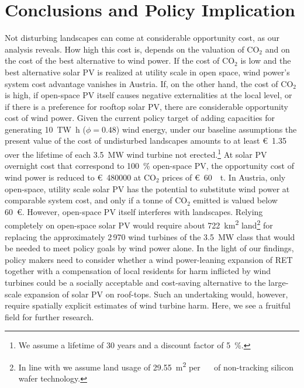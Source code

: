 \documentclass[review, 3p, times, 12pt]{elsarticle} %
\newcommand{\COO}{\ensuremath{\mathrm{CO_2}} }
\begin{document}
\section{Conclusions and Policy Implication} \label{sec:conclusions-policy-implication}
Not disturbing landscapes can come at considerable opportunity cost, as our analysis reveals.
How high this cost is, depends on the valuation of \COO and on the cost of the best alternative to wind power.
If the cost of \COO is low and the best alternative solar PV is realized at utility scale in open space, wind power's system cost advantage vanishes in Austria.
If, on the other hand, the cost of \COO is high, if open-space PV itself causes negative externalities at the local level, or if there is a preference for rooftop solar PV, there are considerable opportunity cost of wind power.
Given the current policy target of adding capacities for generating \SI{10}{\tera\watt\hour} ($\phi=0.48$) wind energy, under our baseline assumptions the present value of the cost of undisturbed landscapes amounts to at least \SI{1.35}[\euro]{\million} over the lifetime of each \SI{3.5}{\mega\watt} wind turbine not erected.\footnote{We assume a lifetime of 30 years and a discount factor of \SI{5}{\percent}.}
At solar PV overnight cost that correspond to \SI{100}{\percent} open-space PV, the opportunity cost of wind power is reduced to \SI{480000}[\euro]{} at \COO prices of \SI{60}[\euro]{\per\tonne}.
In Austria, only open-space, utility scale solar PV has the potential to substitute wind power at comparable system cost, and only if a tonne of \COO emitted is valued below \SI{60}{\euro}.
However, open-space PV itself interferes with landscapes.
Relying completely on open-space solar PV would require about \SI{722}{\square\kilo\meter} land\footnote{In line with \cite{Guennewig2007} we assume land usage of \SI{29.55}{\square\meter} per \SI{}{\kilo\wattpeak} of non-tracking silicon wafer technology.} for replacing the approximately 2\,970 wind turbines of the \SI{3.5}{\mega\watt} class that would be needed to meet policy goals by wind power alone.
In the light of our findings, policy makers need to consider whether a wind power-leaning expansion of RET together with a compensation of local residents for harm inflicted by wind turbines could be a socially acceptable and cost-saving alternative to the large-scale expansion of solar PV on roof-tops.
Such an undertaking would, however, require spatially explicit estimates of wind turbine harm.
Here, we see a fruitful field for further research.
\end{document}
